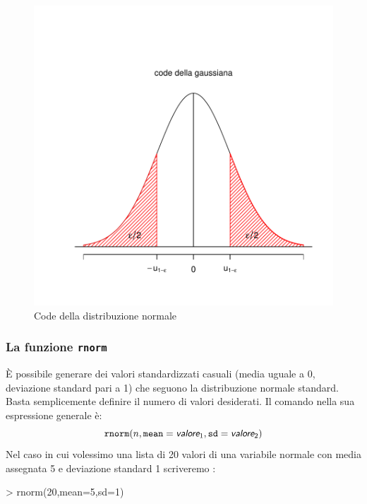 \documentclass[onecolumn,11pt]{book}
\newcommand{\varia}[1]{\textsl{\textsf{#1}}}
\begin{document}
\begin{figure}[htbp]
\begin{center}
\includegraphics{statisticaconR-190}
\caption{ Code della distribuzione normale}
\label{normaletratto}
\end{center}
\end{figure}

 \subsubsection{La funzione \texttt{rnorm}}
\`E possibile generare dei valori standardizzati casuali (media uguale a 0, deviazione standard pari a 1) che seguono la distribuzione normale standard. Basta semplicemente definire il numero di valori desiderati.
Il comando nella sua espressione generale \`e:
\begin{equation}\texttt{rnorm}(n,\texttt{mean}=\varia{valore}_1,\texttt{sd}=\varia{valore}_2)\end{equation}
Nel caso in cui volessimo una lista di 20 valori di una variabile normale con media assegnata 5 e deviazione standard 1 scriveremo :

\begin{Schunk}
\begin{Sinput}
> rnorm(20,mean=5,sd=1)
\end{Sinput}
\end{Schunk}
\end{document}
